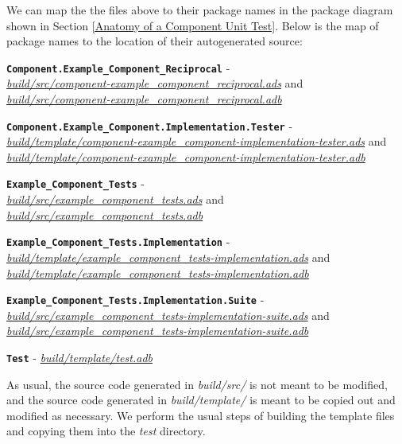 We can map the the files above to their package names in the package diagram shown in Section \ref{Anatomy of a Component Unit Test}. Below is the map of package names to the location of their autogenerated source:

\vspace{5mm} %
\begin{spaceditemize}
  \item \textbf{\texttt{Component.Example\_Component\_Reciprocal}} - \\ \textit{\url{build/src/component-example\_component\_reciprocal.ads}} and \\ \textit{\url{build/src/component-example\_component\_reciprocal.adb}}
  \item \textbf{\texttt{Component.Example\_Component.Implementation.Tester}} - \\ \textit{\url{build/template/component-example\_component-implementation-tester.ads}} and \\ \textit{\url{build/template/component-example\_component-implementation-tester.adb}}
  \item \textbf{\texttt{Example\_Component\_Tests}} - \\ \textit{\url{build/src/example\_component\_tests.ads}} and \\ \textit{\url{build/src/example\_component\_tests.adb}}
  \item \textbf{\texttt{Example\_Component\_Tests.Implementation}} - \\ \textit{\url{build/template/example\_component\_tests-implementation.ads}} and \\ \textit{\url{build/template/example\_component\_tests-implementation.adb}}
  \item \textbf{\texttt{Example\_Component\_Tests.Implementation.Suite}} - \\ \textit{\url{build/src/example\_component\_tests-implementation-suite.ads}} and \\ \textit{\url{build/src/example\_component\_tests-implementation-suite.adb}}
  \item \textbf{\texttt{Test}} - \textit{\url{build/template/test.adb}}
\end{spaceditemize}
\vspace{5mm} %

As usual, the source code generated in \textit{build/src/} is not meant to be modified, and the source code generated in \textit{build/template/} is meant to be copied out and modified as necessary. We perform the usual steps of building the template files and copying them into the \textit{test} directory.

